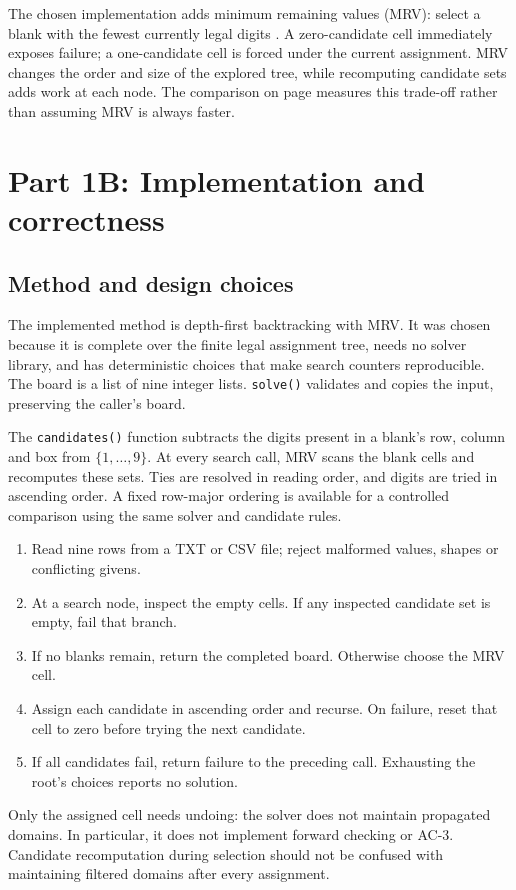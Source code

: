 \documentclass[11pt,a4paper]{article}
\begin{document}
The chosen implementation adds minimum remaining values (MRV): select a blank with the fewest currently legal digits \cite{ordering}. A zero-candidate cell immediately exposes failure; a one-candidate cell is forced under the current assignment. MRV changes the order and size of the explored tree, while recomputing candidate sets adds work at each node. The comparison on page \pageref{evaluation} measures this trade-off rather than assuming MRV is always faster.

\clearpage
\section{Part 1B: Implementation and correctness}
\subsection{Method and design choices}
The implemented method is depth-first backtracking with MRV. It was chosen because it is complete over the finite legal assignment tree, needs no solver library, and has deterministic choices that make search counters reproducible. The board is a list of nine integer lists. \texttt{solve()} validates and copies the input, preserving the caller's board.

The \texttt{candidates()} function subtracts the digits present in a blank's row, column and box from $\{1,\ldots,9\}$. At every search call, MRV scans the blank cells and recomputes these sets. Ties are resolved in reading order, and digits are tried in ascending order. A fixed row-major ordering is available for a controlled comparison using the same solver and candidate rules.

\begin{enumerate}
\item Read nine rows from a TXT or CSV file; reject malformed values, shapes or conflicting givens.
\item At a search node, inspect the empty cells. If any inspected candidate set is empty, fail that branch.
\item If no blanks remain, return the completed board. Otherwise choose the MRV cell.
\item Assign each candidate in ascending order and recurse. On failure, reset that cell to zero before trying the next candidate.
\item If all candidates fail, return failure to the preceding call. Exhausting the root's choices reports no solution.
\end{enumerate}
Only the assigned cell needs undoing: the solver does not maintain propagated domains. In particular, it does not implement forward checking or AC-3. Candidate recomputation during selection should not be confused with maintaining filtered domains after every assignment.
\end{document}
